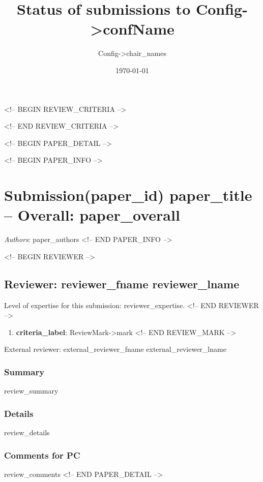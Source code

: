 \documentclass{article}
\begin{document}
\title{ \textbf{Status of submissions to {Config->confName}}}
\author{ {Config->chair_names} }
\date{\today}

\maketitle

\tableofcontents


    <!-- BEGIN REVIEW_CRITERIA -->
    
     <!-- END REVIEW_CRITERIA -->


<!-- BEGIN PAPER_DETAIL -->

 <!-- BEGIN PAPER_INFO -->

\section{Submission({paper_id}) {paper_title} -- Overall: {paper_overall}}  

\textit{Authors}: {paper_authors}
 <!-- END PAPER_INFO -->

     <!-- BEGIN REVIEWER -->
 \subsection{Reviewer:  {reviewer_fname} {reviewer_lname}}
    
   Level of expertise for this submission: {reviewer_expertise}.   
     <!-- END REVIEWER -->
\begin{enumerate}
    <!-- BEGIN REVIEW_MARK -->
      \item \textbf{{criteria_label}}: {ReviewMark->mark}
    <!-- END REVIEW_MARK -->
 \end{enumerate}
External reviewer:   {external_reviewer_fname}  {external_reviewer_lname} 
   \subsubsection*{Summary}
   {review_summary}
      
   \subsubsection*{Details}
   {review_details}

   \subsubsection*{Comments for PC}
   {review_comments}
<!-- END PAPER_DETAIL -->

\end{document}
